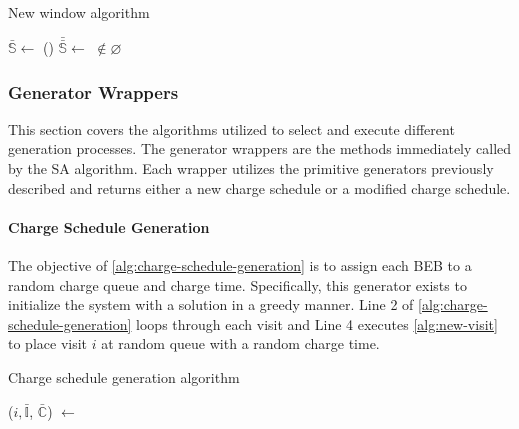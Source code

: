 \documentclass[11pt,a4paper,final]{article}
\newcommand{\I}{\mathbb{I}}                 %
\newcommand{\C}{\mathbb{C}}                 %
\newcommand{\Sol}{\mathbb{S}}               %
\begin{document}
\begin{algorithm}[H]
  \caption{New window algorithm} \label{alg:new-window}
  \LinesNumbered
  \KwIn{$\Sol$}
  \KwOut{$\bar{\Sol}$}


  \Begin
  {
    $\bar{\Sol} \leftarrow$\Purge{$\Sol$}
    \If()
       {
         $\bar{\bar{\Sol}} \leftarrow$ \NewVisit{$\bar{\Sol}$} $\not\in \varnothing$
       }
       {
         \Return{$\bar{\bar{\Sol}}$} 
       }

       \Return{($\varnothing$)}
  }
\end{algorithm}

\subsubsection{Generator Wrappers}
\label{sec:generator-wrappers}
This section covers the algorithms utilized to select and execute different generation processes. The generator wrappers
are the methods immediately called by the SA algorithm. Each wrapper utilizes the primitive generators previously
described and returns either a new charge schedule or a modified charge schedule.

\paragraph{Charge Schedule Generation}
\label{sec:charge-schedule-generation}
The objective of \ref{alg:charge-schedule-generation} is to assign each BEB to a random charge queue and charge time.
Specifically, this generator exists to initialize the system with a solution in a greedy manner. Line 2 of
\ref{alg:charge-schedule-generation} loops through each visit and Line 4 executes \ref{alg:new-visit} to place visit \(i\)
at random queue with a random charge time.

\begin{algorithm}[H]
\caption{Charge schedule generation algorithm} \label{alg:charge-schedule-generation}
    \LinesNumbered
    \KwIn{$\Sol$}
    \KwOut{$\bar{\Sol}$}


    \Begin
    {
        \ForEach {$\I_i \in \I$}
        {
            ($i, \bar{\I}$, $\bar{\C}$) $\leftarrow$ \NewVisit{($\I_i$, $\I$, $\C$)}
        }
            \Return{($0, \bar{\I}$, $\bar{\C}$)}
    }
  \end{algorithm}
\end{document}
